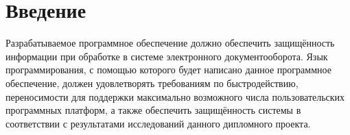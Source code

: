 \section{Введение} \label{technologic_introduction}

Разрабатываемое программное обеспечение должно обеспечить защищённость информации при обработке в системе электронного документооборота. Язык программирования, с помощью которого будет написано данное программное обеспечение, должен удовлетворять требованиям по быстродействию, переносимости для поддержки максимально возможного числа пользовательских программных платформ, а также обеспечить защищённость системы в соответствии с результатами исследований данного дипломного проекта.